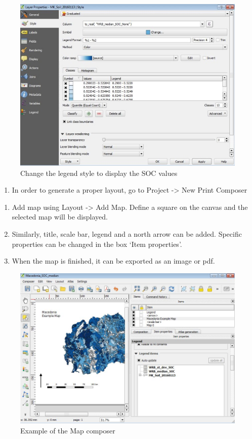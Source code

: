 \documentclass[10pt,b5paper,]{book}
\providecommand{\tightlist}{%
  \setlength{\itemsep}{0pt}\setlength{\parskip}{0pt}}
\theoremstyle{definition}
\theoremstyle{definition}
\theoremstyle{definition}
\theoremstyle{remark}
\begin{document}
\begin{figure}

{\centering \includegraphics[width=0.8\linewidth]{images/Conv_upscaling7} 

}

\caption{Change the legend style to display the SOC values}\label{fig:unnamed-chunk-29}
\end{figure}

\begin{enumerate}
\def\labelenumi{\arabic{enumi}.}
\setcounter{enumi}{8}
\tightlist
\item
  In order to generate a proper layout, go to Project -\textgreater{}
  New Print Composer
\end{enumerate}

\begin{enumerate}
\def\labelenumi{\alph{enumi}.}
\tightlist
\item
  Add map using Layout -\textgreater{} Add Map. Define a square on the
  canvas and the selected map will be displayed.
\item
  Similarly, title, scale bar, legend and a north arrow can be added.
  Specific properties can be changed in the box `Item properties'.
\item
  When the map is finished, it can be exported as an image or pdf.
\end{enumerate}

\begin{figure}

{\centering \includegraphics[width=0.8\linewidth]{images/Conv_upscaling8} 

}

\caption{Example of the Map composer}\label{fig:unnamed-chunk-30}
\end{figure}
\end{document}
